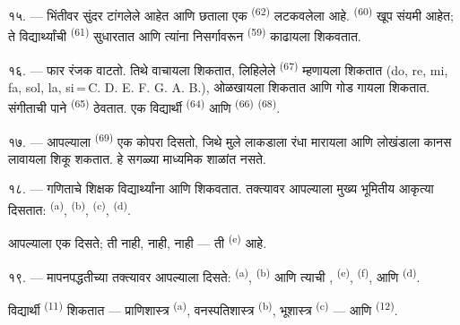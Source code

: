 \VUsaut{4.6mm}
\VUsaut{3.4mm}

१५. ---  भिंतीवर सुंदर  टांगलेले आहेत
आणि छताला  एक  \textsuperscript{(62)} लटकवलेला आहे.
 \textsuperscript{(60)} खूप संयमी आहेत; ते विद्यार्थ्यांची
 \textsuperscript{(61)} सुधारतात आणि त्यांना निसर्गावरून
 \textsuperscript{(59)} काढायला शिकवतात.

१६. ---  फार रंजक वाटतो. तिथे  वाचायला
शिकतात,  लिहिलेले  \textsuperscript{(67)}
म्हणायला शिकतात (do, re, mi, fa, sol, la, si\,=\,C. D. E. F. G. A. B.),
 ओळखायला शिकतात आणि गोड  गायला शिकतात. संगीताची पाने
 \textsuperscript{(65)} ठेवतात. एक विद्यार्थी  \textsuperscript{(64)} आणि  \textsuperscript{(66)}
 \textsuperscript{(68)}.

१७. --- आपल्याला  \textsuperscript{(69)}
 एक कोपरा दिसतो, जिथे मुले लाकडाला रंधा मारायला आणि लोखंडाला
कानस लावायला शिकू शकतात. हे सगळ्या माध्यमिक शाळांत नसते.

\VUsaut{5.0mm}
\VUsaut{3.6mm}

१८. --- गणिताचे शिक्षक विद्यार्थ्यांना 
आणि  शिकवतात. तक्त्यावर आपल्याला मुख्य भूमितीय आकृत्या
दिसतात:  \textsuperscript{(a)},  \textsuperscript{(b)},
 \textsuperscript{(c)},  \textsuperscript{(d)}.

आपल्याला एक  दिसते; ती  नाही, 
नाही,  नाही --- ती  \textsuperscript{(e)} आहे.

१९. --- मापनपद्धतीच्या तक्त्यावर आपल्याला दिसते: 
\textsuperscript{(a)},  \textsuperscript{(b)} आणि त्याची
,  \textsuperscript{(e)}, 
\textsuperscript{(f)},  आणि  \textsuperscript{(d)}.

विद्यार्थी  \textsuperscript{(11)} शिकतात --- प्राणिशास्त्र
\textsuperscript{(a)}, वनस्पतिशास्त्र \textsuperscript{(b)}, भूशास्त्र
\textsuperscript{(c)} --- आणि  \textsuperscript{(12)}.


